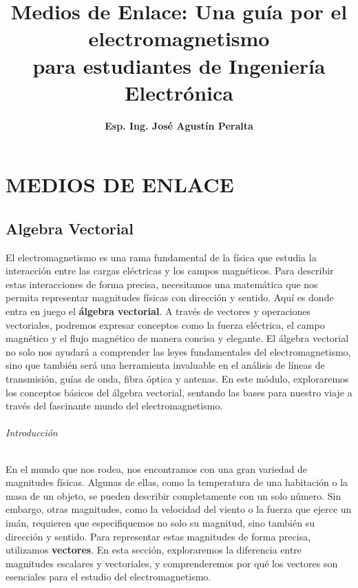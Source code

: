 \documentclass{book}
\begin{document}
\part {MEDIOS DE ENLACE}
\title{\LARGE Medios de Enlace: Una guía por el electromagnetismo \\ 
{\small para estudiantes de Ingeniería Electrónica}} 
\author{\small \textbf{Esp. Ing. José Agustín Peralta}} 
\date{} 
\maketitle 
    

\chapter{Algebra Vectorial}

El electromagnetismo es una rama fundamental de la física que estudia la interacción entre las cargas eléctricas y los campos magnéticos. Para describir estas interacciones de forma precisa, necesitamos una matemática que nos permita representar magnitudes físicas con dirección y sentido. Aquí es donde entra en juego el \textbf{álgebra vectorial}. A través de vectores y operaciones vectoriales, podremos expresar conceptos como la fuerza eléctrica, el campo magnético y el flujo magnético de manera concisa y elegante. El álgebra vectorial no solo nos ayudará a comprender las leyes fundamentales del electromagnetismo, sino que también será una herramienta invaluable en el análisis de líneas de transmisión, guías de onda, fibra óptica y antenas. En este módulo, exploraremos los conceptos básicos del álgebra vectorial, sentando las bases para nuestro viaje a través del fascinante mundo del electromagnetismo.

\paragraph{Introducción}

En el mundo que nos rodea, nos encontramos con una gran variedad de magnitudes físicas. Algunas de ellas, como la temperatura de una habitación o la masa de un objeto, se pueden describir completamente con un solo número. Sin embargo, otras magnitudes, como la velocidad del viento o la fuerza que ejerce un imán, requieren que especifiquemos no solo su magnitud, sino también su dirección y sentido. Para representar estas magnitudes de forma precisa, utilizamos \textbf{vectores}. En esta sección, exploraremos la diferencia entre magnitudes escalares y vectoriales, y comprenderemos por qué los vectores son esenciales para el estudio del electromagnetismo.
   
\end{document}
